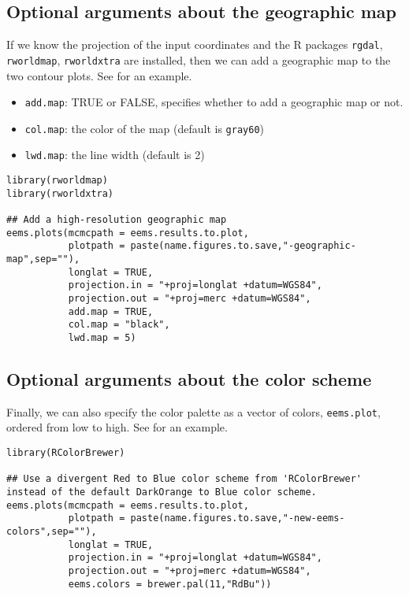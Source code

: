 \documentclass[a4paper,10pt,DIV=15,titlepage,mpinclude=true]{scrartcl}
\newcommand{\keystring}[1]{{\tt #1}}
\begin{document}
\subsection{Optional arguments about the geographic map}

If we know the projection of the input coordinates and the R packages \keystring{rgdal}, \keystring{rworldmap}, \keystring{rworldxtra} are installed, then we can add a geographic map to the two contour plots. See  for an example.

\begin{itemize}
  \item \keystring{add.map}: TRUE or FALSE, specifies whether to add a geographic map or not.
  \item \keystring{col.map}: the color of the map (default is \keystring{gray60})
  \item \keystring{lwd.map}: the line width (default is 2)
\end{itemize}

\begin{lstlisting}[style=Rcode]
library(rworldmap)
library(rworldxtra)

## Add a high-resolution geographic map
eems.plots(mcmcpath = eems.results.to.plot,
           plotpath = paste(name.figures.to.save,"-geographic-map",sep=""),
           longlat = TRUE,
           projection.in = "+proj=longlat +datum=WGS84",
           projection.out = "+proj=merc +datum=WGS84",
           add.map = TRUE,
           col.map = "black",
           lwd.map = 5)
\end{lstlisting}

\subsection{Optional arguments about the color scheme}

Finally, we can also specify the color palette as a vector of colors, \keystring{eems.plot}, ordered from low to high. See  for an example.

\begin{lstlisting}[style=Rcode]
library(RColorBrewer)

## Use a divergent Red to Blue color scheme from 'RColorBrewer' instead of the default DarkOrange to Blue color scheme.                                                     
eems.plots(mcmcpath = eems.results.to.plot,
           plotpath = paste(name.figures.to.save,"-new-eems-colors",sep=""),
           longlat = TRUE,
           projection.in = "+proj=longlat +datum=WGS84",
           projection.out = "+proj=merc +datum=WGS84",
           eems.colors = brewer.pal(11,"RdBu"))
\end{lstlisting}
\end{document}
